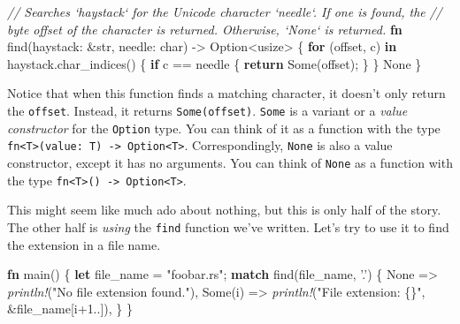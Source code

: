 \documentclass[a4paper,]{book}
\newenvironment{Shaded}{\begin{snugshade}}{\end{snugshade}}
\newcommand{\KeywordTok}[1]{\textcolor[rgb]{0.13,0.29,0.53}{\textbf{{#1}}}}
\newcommand{\DataTypeTok}[1]{\textcolor[rgb]{0.13,0.29,0.53}{{#1}}}
\newcommand{\DecValTok}[1]{\textcolor[rgb]{0.00,0.00,0.81}{{#1}}}
\newcommand{\ConstantTok}[1]{\textcolor[rgb]{0.00,0.00,0.00}{{#1}}}
\newcommand{\CharTok}[1]{\textcolor[rgb]{0.31,0.60,0.02}{{#1}}}
\newcommand{\StringTok}[1]{\textcolor[rgb]{0.31,0.60,0.02}{{#1}}}
\newcommand{\CommentTok}[1]{\textcolor[rgb]{0.56,0.35,0.01}{\textit{{#1}}}}
\newcommand{\PreprocessorTok}[1]{\textcolor[rgb]{0.56,0.35,0.01}{\textit{{#1}}}}
\newcommand{\NormalTok}[1]{{#1}}
\begin{document}
\protect\hypertarget{code-option-ex-string-find}{}{}

\begin{Shaded}
\begin{Highlighting}[]
\CommentTok{// Searches `haystack` for the Unicode character `needle`. If one is found, the}
\CommentTok{// byte offset of the character is returned. Otherwise, `None` is returned.}
\KeywordTok{fn} \NormalTok{find(haystack: &}\DataTypeTok{str}\NormalTok{, needle: }\DataTypeTok{char}\NormalTok{) -> }\DataTypeTok{Option}\NormalTok{<}\DataTypeTok{usize}\NormalTok{> \{}
    \KeywordTok{for} \NormalTok{(offset, c) }\KeywordTok{in} \NormalTok{haystack.char_indices() \{}
        \KeywordTok{if} \NormalTok{c == needle \{}
            \KeywordTok{return} \ConstantTok{Some}\NormalTok{(offset);}
        \NormalTok{\}}
    \NormalTok{\}}
    \ConstantTok{None}
\NormalTok{\}}
\end{Highlighting}
\end{Shaded}

Notice that when this function finds a matching character, it doesn't
only return the \texttt{offset}. Instead, it returns
\texttt{Some(offset)}. \texttt{Some} is a variant or a \emph{value
constructor} for the \texttt{Option} type. You can think of it as a
function with the type
\texttt{fn\textless{}T\textgreater{}(value:\ T)\ -\textgreater{}\ Option\textless{}T\textgreater{}}.
Correspondingly, \texttt{None} is also a value constructor, except it
has no arguments. You can think of \texttt{None} as a function with the
type
\texttt{fn\textless{}T\textgreater{}()\ -\textgreater{}\ Option\textless{}T\textgreater{}}.

This might seem like much ado about nothing, but this is only half of
the story. The other half is \emph{using} the \texttt{find} function
we've written. Let's try to use it to find the extension in a file name.

\begin{Shaded}
\begin{Highlighting}[]
\KeywordTok{fn} \NormalTok{main() \{}
    \KeywordTok{let} \NormalTok{file_name = }\StringTok{"foobar.rs"}\NormalTok{;}
    \KeywordTok{match} \NormalTok{find(file_name, }\CharTok{'.'}\NormalTok{) \{}
        \ConstantTok{None} \NormalTok{=> }\PreprocessorTok{println!}\NormalTok{(}\StringTok{"No file extension found."}\NormalTok{),}
        \ConstantTok{Some}\NormalTok{(i) => }\PreprocessorTok{println!}\NormalTok{(}\StringTok{"File extension: \{\}"}\NormalTok{, &file_name[i+}\DecValTok{1.}\NormalTok{.]),}
    \NormalTok{\}}
\NormalTok{\}}
\end{Highlighting}
\end{Shaded}
\end{document}
